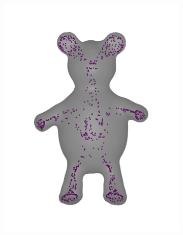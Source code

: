 \documentclass[annual]{acmsiggraph}
\begin{document}
\begin{figure}
\begin{subfigure}[b]{0.19\linewidth}
                \includegraphics[width=\textwidth]{images/bear/3.pdf}
        \end{subfigure}
~
		\begin{subfigure}[b]{0.19\linewidth}
                \centering

\end{subfigure}
\end{figure}
\end{document}
